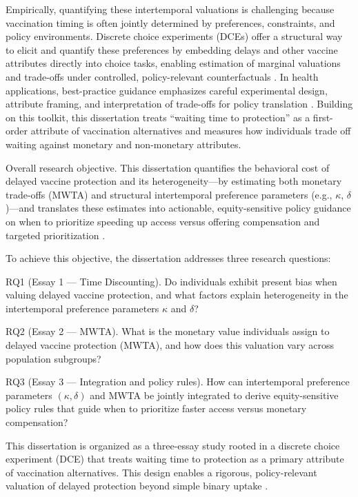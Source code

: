 \documentclass[doublespacing]{utdthesis}
\let\cite=\citep
\begin{document}
Empirically, quantifying these intertemporal valuations is challenging because vaccination timing is often jointly determined by preferences, constraints, and policy environments. Discrete choice experiments (DCEs) offer a structural way to elicit and quantify these preferences by embedding delays and other vaccine attributes directly into choice tasks, enabling estimation of marginal valuations and trade-offs under controlled, policy-relevant counterfactuals \cite{Louviere2000,Train2009}. In health applications, best-practice guidance emphasizes careful experimental design, attribute framing, and interpretation of trade-offs for policy translation \cite{Johnson2013ISPOR}. Building on this toolkit, this dissertation treats “waiting time to protection” as a first-order attribute of vaccination alternatives and measures how individuals trade off waiting against monetary and non-monetary attributes.

Overall research objective. This dissertation quantifies the behavioral cost of delayed vaccine protection and its heterogeneity—by estimating both monetary trade-offs (MWTA) and structural intertemporal preference parameters (e.g., $\kappa$, $\delta$)—and translates these estimates into actionable, equity-sensitive policy guidance on when to prioritize speeding up access versus offering compensation and targeted prioritization \cite{Attema2018,Train2009,Louviere2000,Johnson2013ISPOR}.

To achieve this objective, the dissertation addresses three research questions:

RQ1 (Essay 1 — Time Discounting).
Do individuals exhibit present bias when valuing delayed vaccine protection, and what factors explain heterogeneity in the intertemporal preference parameters $\kappa$ and $\delta$?

RQ2 (Essay 2 — MWTA).
What is the monetary value individuals assign to delayed vaccine protection (MWTA), and how does this valuation vary across population subgroups?

RQ3 (Essay 3 — Integration and policy rules).
How can intertemporal preference parameters $(\kappa, \delta)$ and MWTA be jointly integrated to derive equity-sensitive policy rules that guide when to prioritize faster access versus monetary compensation?

This dissertation is organized as a three-essay study rooted in a discrete choice experiment (DCE) that treats waiting time to protection as a primary attribute of vaccination alternatives. This design enables a rigorous, policy-relevant valuation of delayed protection beyond simple binary uptake \cite{Louviere2000, Train2009, Johnson2013ISPOR}.
\end{document}

